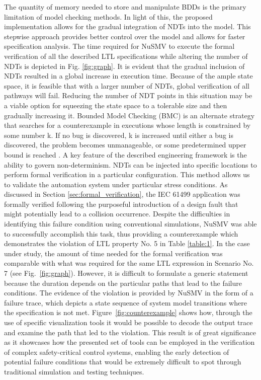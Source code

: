 \begin{bibunit}
The quantity of memory needed to store and manipulate BDDs is the primary limitation of model checking methods. In light of this, the proposed implementation allows for the gradual integration of NDTs into the model. This stepwise approach provides better control over the model and allows for faster specification analysis. The time required for NuSMV to execute the formal verification of all the described LTL specifications while altering the number of NDTs is depicted in Fig. \ref{fig:graph}. It is evident that the gradual inclusion of NDTs resulted in a global increase in execution time.
Because of the ample state space, it is feasible that with a larger number of NDTs, global verification of all pathways will fail.
Reducing the number of NDT points in this situation may be a viable option for squeezing the state space to a tolerable size and then gradually increasing it.
Bounded Model Checking (BMC) is an alternate strategy that searches for a counterexample in executions whose length is constrained by some number k. If no bug is discovered, k is increased until either a bug is discovered, the problem becomes unmanageable, or some predetermined upper bound is reached \cite{Biere2003}.
A key feature of the described engineering framework is the ability to govern non-determinism. NDTs can be injected into specific locations to perform formal verification in a particular configuration. This method allows us to validate the automation system under particular stress conditions.
As discussed in Section \ref{sec:formal_verification}, the IEC 61499 application was formally verified following the purposeful introduction of a design fault that might potentially lead to a collision occurrence.
Despite the difficulties in identifying this failure condition using conventional simulations, NuSMV was able to successfully accomplish this task, thus providing a counterexample which demonstrates the violation of LTL property No. 5 in Table \ref{table:1}.
In the case under study, the amount of time needed for the formal verification was comparable with what was required for the same LTL expression in Scenario No. 7 (see \mbox{Fig. \ref{fig:graph}}). However, it is difficult to formulate a generic statement because the duration depends on the particular paths that lead to the failure conditions. 
The evidence of the violation is provided by NuSMV in the form of a failure trace, which depicts a state sequence of system model transitions where the specification is not met. \mbox{Figure \ref{fig:counterexample}} shows how, through the use of specific visualization tools \cite{pakonen2018} it would be possible to decode the output trace and examine the path that led to the violation. 
This result is of great significance as it showcases how the presented set of tools can be employed in the verification of complex safety-critical control systems, enabling the early detection of potential failure conditions that would be extremely difficult to spot through traditional simulation and testing techniques. 


\end{bibunit}
